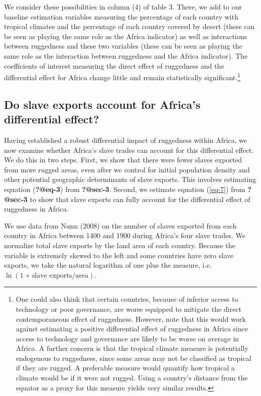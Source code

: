 \documentclass[
  letterpaper,
  DIV=11,
  numbers=noendperiod]{scrartcl}
\begin{document}
We consider these possibilities in column (4) of table 3. There, we add
to our baseline estimation variables measuring the percentage of each
country with tropical climates and the percentage of each country
covered by desert (these can be seen as playing the same role as the
Africa indicator) as well as interactions between ruggedness and these
two variables (these can be seen as playing the same role as the
interaction between ruggedness and the Africa indicator). The
coefficients of interest measuring the direct effect of ruggedness and
the differential effect for Africa change little and remain
statistically significant.\footnote{One could also think that certain
  countries, because of inferior access to technology or poor
  governance, are worse equipped to mitigate the direct contemporaneous
  effect of ruggedness. However, note that this would work against
  estimating a positive differential effect of ruggedness in Africa
  since access to technology and governance are likely to be worse on
  average in Africa. A further concern is that the tropical climate
  measure is potentially endogenous to ruggedness, since some areas may
  not be classified as tropical if they are rugged. A preferable measure
  would quantify how tropical a climate would be if it were not rugged.
  Using a country's distance from the equator as a proxy for this
  measure yields very similar results.}

\subsection{Do slave exports account for Africa's differential
effect?}\label{sec-5}

Having established a robust differential impact of ruggedness within
Africa, we now examine whether Africa's slave trades can account for
this differential effect. We do this in two steps. First, we show that
there were fewer slaves exported from more rugged areas, even after we
control for initial population density and other potential geographic
determinants of slave exports. This involves estimating equation
(\textbf{?@eq-3}) from \textbf{?@sec-3}. Second, we estimate equation
(\ref{eq-7}) from \textbf{?@sec-3} to show that slave exports can fully
account for the differential effect of ruggedness in Africa.

We use data from Nunn (2008) on the number of slaves exported from each
country in Africa between 1400 and 1900 during Africa's four slave
trades. We normalize total slave exports by the land area of each
country. Because the variable is extremely skewed to the left and some
countries have zero slave exports, we take the natural logarithm of one
plus the measure, i.e.~\(\ln(1 + \text{slave exports} / \text{area})\).
\end{document}
